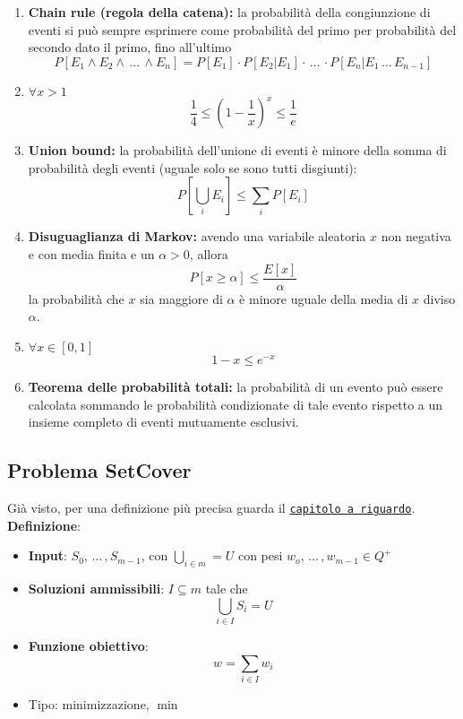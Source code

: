 \begin{enumerate}
	\item \textbf{Chain rule (regola della catena):} la probabilità della congiunzione di eventi si può sempre esprimere come probabilità del primo per probabilità del secondo dato il primo, fino all'ultimo
	$$ P[E_1 \wedge E_2 \wedge \, \dots \, \wedge E_n] = P [E_1] \cdot P [E_2 | E_1] \cdot \, \dots \, \cdot P[E_n | E_1 \, \dots \, E_{n-1}] $$
	
	\item $\forall x > 1$
	$$ \frac{1}{4} \leq \left(1 - \frac{1}{x}\right)^x \leq \frac{1}{e} $$
	
	\item \textbf{Union bound:} la probabilità dell'unione di eventi è minore della somma di probabilità degli eventi (uguale solo se sono tutti disgiunti):
	$$ P\left[ \bigcup_i E_i \right] \leq \sum_i P[E_i] $$
	
	\item \textbf{Disuguaglianza di Markov:} avendo una variabile aleatoria $x$ non negativa e con media finita e un $\alpha > 0$, allora
	$$ P[x \geq \alpha] \leq \frac{E[x]}{\alpha} $$
	la probabilità che $x$ sia maggiore di $\alpha$ è minore uguale della media di $x$ diviso $\alpha$.
	
	\item $\forall x \in [0,1]$
	$$ 1 - x \leq e^{-x} $$
	
	\item \textbf{Teorema delle probabilità totali:} la probabilità di un evento può essere calcolata sommando le probabilità condizionate di tale evento rispetto a un insieme completo di eventi mutuamente esclusivi.\\
\end{enumerate}

\newpage

\subsection{Problema SetCover}

Già visto, per una definizione più precisa guarda il \hyperref[subsec:setcover]{\texttt{capitolo a riguardo}}.\\

\textbf{Definizione}:
\begin{itemize}
	\item \textbf{Input}: $S_0, \, \dots \, , S_{m-1}$, con $\bigcup_{i \in m} = U$ con pesi $w_o, \, \dots \, , w_{m-1} \in Q^+$
	
	\item \textbf{Soluzioni ammissibili}: $I \subseteq m$ tale che
	$$ \bigcup_{i \in I} S_i = U $$
	
	\item \textbf{Funzione obiettivo}: 
	$$ w = \sum_{i \in I} w_i $$
	
	\item Tipo: minimizzazione, $\min$
\end{itemize} 

